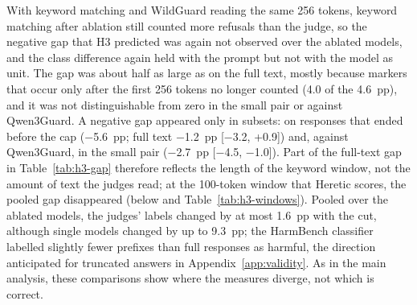 
With keyword matching and WildGuard reading the same 256 tokens, keyword
matching after ablation still counted more refusals than the judge, so the
negative gap that H3 predicted was again not observed over the ablated models,
and the class difference again held with the prompt but not with the model as
unit. The gap was about half as
large as on the full text, mostly because markers that occur only after the
first 256 tokens no longer counted (4.0 of the 4.6~pp), and it was not
distinguishable from zero in the small pair or against Qwen3Guard. A negative
gap appeared only in subsets: on responses that ended before the cap
($-$5.6~pp; full text $-$1.2~pp [$-$3.2, +0.9]) and, against Qwen3Guard, in
the small pair ($-$2.7~pp [$-$4.5, $-$1.0]). Part of the full-text gap in
Table~\ref{tab:h3-gap} therefore reflects the length of the keyword window,
not the amount of text the judges read; at the 100-token window that Heretic
scores, the pooled gap disappeared (below and Table~\ref{tab:h3-windows}). Pooled over the ablated models, the
judges' labels changed by at most 1.6~pp with the cut, although single models
changed by up to 9.3~pp; the HarmBench classifier labelled slightly fewer
prefixes than full responses as harmful, the direction anticipated for
truncated answers in Appendix~\ref{app:validity}. As in the main analysis,
these comparisons show where the measures diverge, not which is correct.

